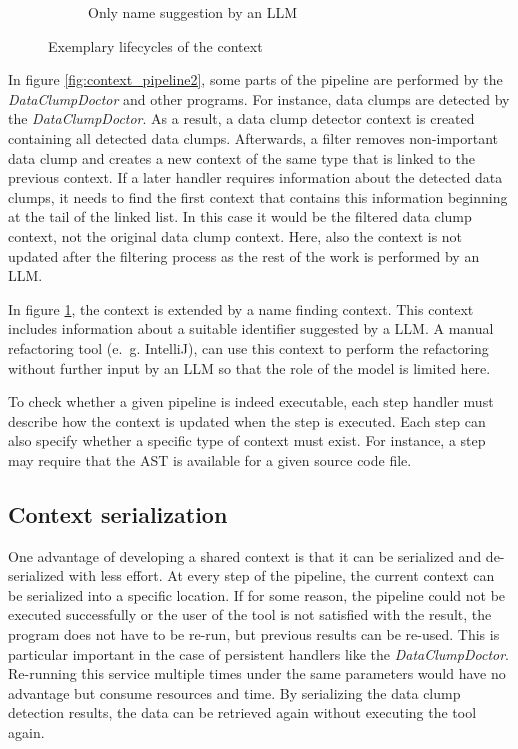 \begin{figure}[H]
\begin{adjustbox}{minipage=\linewidth,scale=0.7}
\begin{subfigure}[b]{0.3\textwidth}
 \caption{Only name suggestion by an \ac{LLM}}         \label{fig:context_pipeline3}
     \end{subfigure}
        \caption{Exemplary lifecycles of the context}
        \label{fig:context_pipeline}
        \end{adjustbox}
\end{figure}

In figure \ref{fig:context_pipeline2}, some parts of the pipeline are performed by the \textit{DataClumpDoctor} and other programs. For instance, data clumps are detected by the \textit{DataClumpDoctor}. As a result, a data clump detector context is created containing all detected data clumps. Afterwards, a filter removes non-important data clump and creates a new context of the same type that is linked to the previous context. If a later handler requires information about the detected data clumps, it needs to find the first context that contains this information  beginning at the tail of the linked list. In this case it would be the filtered data clump context, not the original data clump context. Here, also the context is not updated after the filtering process as the rest of the work is performed by an \ac{LLM}. 

In figure \ref{fig:context_pipeline3}, the context is extended by a name finding context. This context includes information about a suitable identifier suggested by a \ac{LLM}. A manual refactoring tool (e.~g. IntelliJ), can use this context to perform the refactoring without further input by an \ac{LLM} so that the role of the model is limited here. 




To check whether a given pipeline is indeed executable, each step handler must describe how the context is updated when the step is executed. Each step can also specify whether a specific type of context must exist. For instance, a step may require that the \ac{AST} is available for a given source code file. 


\subsection{Context serialization}

One advantage of developing a shared context is that it can be serialized  and de-serialized with less effort. At every step of the pipeline, the current context can be  serialized into a specific location. If for some reason, the pipeline could not be executed successfully or the user of the tool is not satisfied with the result, the program does not have to be re-run, but previous results can be re-used. This is particular important in the case of persistent handlers like the \textit{DataClumpDoctor}. Re-running this service multiple times under the same parameters would have no advantage but consume resources and time. By serializing the data clump detection results, the data can be retrieved again without executing the tool again.

